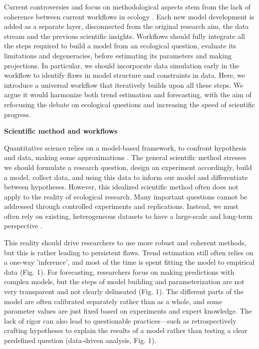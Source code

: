 \documentclass[11pt]{article}
\begin{document}
Current controversies and focus on methodological aspects stem from the lack of coherence between current workflows in ecology \citep{Loreau2022, Talis2023, Johnson2024}. Each new model development is added as a separate layer, disconnected from the original research aim, the data stream and the previous scientific insights. Workflows should fully integrate all the steps required to build a model from an ecological question, evaluate its limitations and degeneracies, before estimating its parameters and making projections. In particular, we should incorporate data simulation early in the workflow to identify flaws in model structure and constraints in data.
Here, we introduce a universal workflow that iteratively builds upon all these steps. We argue it would harmonize both trend estimation and forecasting, with the aim of refocusing the debate on ecological %
questions and increasing the speed of scientific progress.

\vspace{0.5cm}
\noindent \textbf{Scientific method and workflows}

Quantitative science relies on a model-based framework, to confront hypothesis and data, making some approximations \citep{}. The general scientific method stresses we should formulate a research question, design an experiment accordingly, build a model, collect data, and using this data to inform our model and differentiate between hypotheses.
However, this idealized scientific method often does not apply to the reality of ecological research. Many important questions cannot be addressed through controlled experiments and replications. Instead, we must often rely on existing, heterogeneous datasets to have a large-scale and long-term perspective \citep{Hilborn1997}.

This reality should drive researchers to use more robust and coherent methods, but this is rather leading to persistent flaws. 
Trend estimation still often relies on a one-way 'inference',  %
and most of the time is spent fitting the model to empirical data (Fig. 1). For forecasting, researchers focus on making predictions with complex models, but the steps of model building and parameterization are not very transparent and not clearly delineated (Fig. 1). The different parts of the model are often calibrated separately rather than as a whole, and some parameter values are just fixed based on experiments and expert knowledge.
The lack of rigor can also lead to questionable practices---such as retrospectively crafting hypotheses to explain the results of a model rather than testing a clear predefined question (data-driven analysis, Fig. 1).
\end{document}
